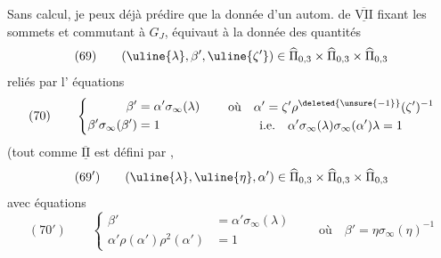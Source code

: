 Sans calcul, je peux déjà prédire que la donnée d'un autom. de $\overline{\underline{\mathrm{VII}}}$ fixant les sommets et commutant à $G_J$, équivaut à la donnée des quantités
\[
(69)\qquad (\uline{\lambda},\beta',\uline{\zeta'})\in\widehat\Pi_{0,3}\times\widehat\Pi_{0,3}\times\widehat\Pi_{0,3}
\]
reliés par l' équations 
\[
(70)\qquad\left\{\begin{aligned}
\beta'&=\alpha'\sigma_\infty(\lambda)\\
\beta'\sigma_\infty(\beta')&=1
\end{aligned}\right.\qquad
\begin{gathered}
\text{où}\quad\alpha'=\zeta'\rho^{\deleted{\unsure{-1}}}(\zeta')^{-1}\\
\text{i.e.}\quad\alpha'\sigma_\infty(\lambda)\sigma_\infty(\alpha')\lambda=1
\end{gathered}
\]
(tout comme  $\overline{\underline{\mathrm{II}}}$ est défini par ,
\[
(69')\qquad(\uline{\lambda},\uline{\eta},\alpha')\in\widehat\Pi_{0,3}\times\widehat\Pi_{0,3}\times\widehat\Pi_{0,3}
\]
avec  équations
\[
(70')\qquad\left\{\begin{aligned}
\beta'&=\alpha'\sigma_\infty(\lambda)\\
\alpha'\rho(\alpha')\rho^2(\alpha')&=1
\end{aligned}\right.\qquad\text{où}\quad\beta'=\eta\sigma_\infty(\eta)^{-1}
\]

